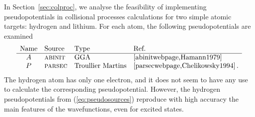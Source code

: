 \documentclass[10pt]{article}
\begin{document}
In Section~\ref{sec:colproc}, we analyse the feasibility of 
implementing pseudopotentials in collisional processes calculations for two 
simple atomic targets: hydrogen and lithium. For each atom, the 
following pseudopotentials are examined
\begin{equation}
 \begin{array}{clll}
  \mbox{Name} & \mbox{Source} & \mbox{Type} & \mbox{Ref.} \\
  \hline  
  A & \mbox{\sc abinit} & \mbox{GGA} & \cite{abinitwebpage,Hamann1979} \\
  P & \mbox{\sc parsec} & \mbox{Troullier Martins} & \cite{parsecwebpage,Chelikowsky1994}\,.
 \end{array}
 \label{eq:pseudosources}
\end{equation}
The hydrogen atom has only one electron, and it does not seem to have 
any use to calculate the corresponding pseudopotential. However, the 
hydrogen pseudopotentials from (\ref{eq:pseudosources}) reproduce with
high accuracy the main features of the wavefunctions, even for excited
states.
\end{document}
